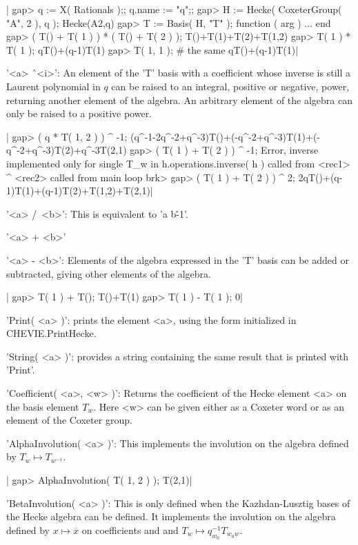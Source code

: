 |    gap> q := X( Rationals );; q.name := "q";;
    gap> H := Hecke( CoxeterGroup( "A", 2 ), q );
    Hecke(A2,q)
    gap> T := Basis( H, "T" );
    function ( arg ) ... end
    gap> ( T() + T( 1 ) ) * ( T() + T( 2 ) );
    T()+T(1)+T(2)+T(1,2)
    gap> T( 1 ) * T( 1 );
    qT()+(q-1)T(1)
    gap> T( 1, 1 ); # the same
    qT()+(q-1)T(1)|

'<a> \^\ <i>':
An  element of the  'T' basis with  a coefficient whose  inverse is still a
Laurent  polynomial  in  $q$  can  be  raised  to  an integral, positive or
negative,  power, returning  another element  of the  algebra. An arbitrary
element of the algebra can only be raised to a positive power.

|    gap> ( q * T( 1, 2 ) ) ^ -1;
    (q^-1-2q^-2+q^-3)T()+(-q^-2+q^-3)T(1)+(-q^-2+q^-3)T(2)+q^-3T(2,1)
    gap> ( T( 1 ) + T( 2 ) ) ^ -1;
    Error, inverse implemented only for single T_w in
    h.operations.inverse( h ) called from
    <rec1> ^ <rec2> called from
    main loop
    brk>
    gap> ( T( 1 ) + T( 2 ) ) ^ 2;
    2qT()+(q-1)T(1)+(q-1)T(2)+T(1,2)+T(2,1)|

'<a> /\ <b>': This is equivalent to 'a\* b\^-1'.

'<a> + <b>'

'<a> - <b>':
Elements of the  algebra  expressed in  the  'T'  basis can be   added or
subtracted, giving other elements of the algebra.

|    gap> T( 1 ) + T();
    T()+T(1)
    gap> T( 1 ) - T( 1 );
    0|

'Print( <a> )':
prints the element <a>, using the form initialized in CHEVIE.PrintHecke.

'String( <a> )':
provides a  string  containing  the same  result  that  is  printed  with
'Print'.

'Coefficient( <a>, <w> )':
Returns the  coefficient of the Hecke  element <a> on the  basis element
$T_w$. Here <w> can  be given either as a Coxeter word  or as an element
of the Coxeter group.

'AlphaInvolution( <a> )':
This   implements the involution   on the algebra  defined by $T_w\mapsto
T_{w^{-1}}$.

|    gap> AlphaInvolution( T( 1, 2 ) );
    T(2,1)|

'BetaInvolution( <a> )':
This  is  only defined  when  the  Kazhdan-Lusztig  bases of  the  Hecke
algebra  can be  defined. It  implements the  involution on  the algebra
defined  by $x\mapsto\overline  x$ on  coefficients and  and $T_w\mapsto
q_{w_0}^{-1}T_{w_0w}$.

